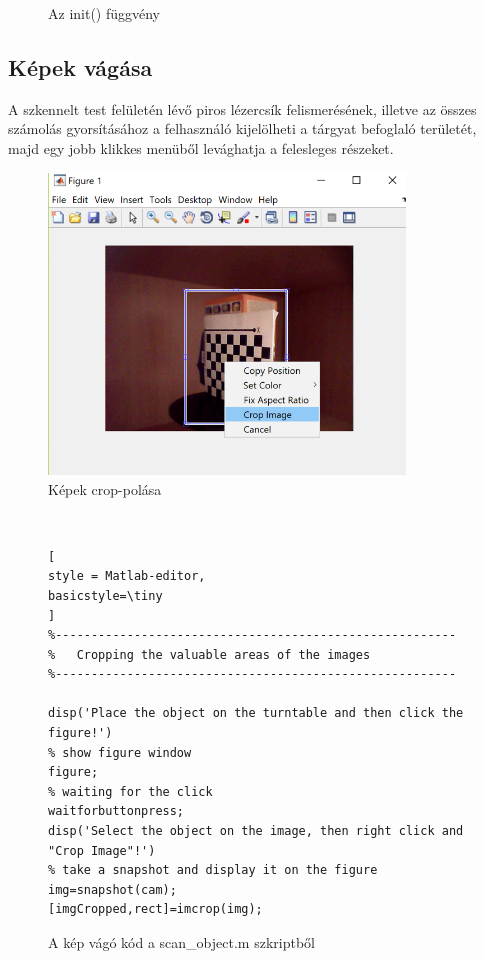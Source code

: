 \documentclass[12pt,a4paper]{article}
\begin{document}
\begin{figure}
\centering

\caption{Az init() függvény}
\end{figure}

\subsection{Képek vágása}
A szkennelt test felületén lévő piros lézercsík felismerésének, illetve az összes számolás gyorsításához a felhasználó kijelölheti a tárgyat befoglaló területét, majd egy jobb klikkes menüből levághatja a felesleges részeket.
\begin{figure}[h!]
	\centering
	\includegraphics[height=8cm]{images/imgCrop}
	\caption{Képek crop-polása}
\end{figure}\\[10pt]
\begin{figure}[h!]
	\centering
\begin{lstlisting}[
style = Matlab-editor,
basicstyle=\tiny
]
%--------------------------------------------------------
%   Cropping the valuable areas of the images
%--------------------------------------------------------

disp('Place the object on the turntable and then click the figure!')
% show figure window
figure;
% waiting for the click
waitforbuttonpress;
disp('Select the object on the image, then right click and "Crop Image"!')
% take a snapshot and display it on the figure
img=snapshot(cam);
[imgCropped,rect]=imcrop(img);
\end{lstlisting}
	\caption{A kép vágó kód a scan\_object.m szkriptből}
\end{figure}
\end{document}
